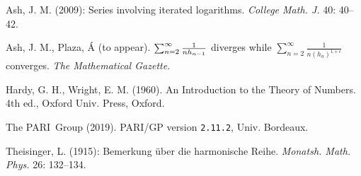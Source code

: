 \documentclass{article}
\theoremstyle{theorem}
\theoremstyle{definition}
\begin{document}
\begin{thebibliography}{1}
 Ash, J. M. (2009): Series involving iterated logarithms.
\textit{College Math. J.} 40: 40--42. %

 Ash, J. M., Plaza, \'{A} (to appear).  $\sum_{n=2}^{\infty }\frac{%
1}{nh_{n-1}}$ diverges while $\sum_{n=2}^{\infty }\frac{1}{n\left(
h_{n}\right) ^{1+\epsilon }}$ converges. \textit{The Mathematical Gazette.} %

 Hardy, G. H., Wright, E. M. (1960). An Introduction to the Theory
of Numbers. 4th ed., Oxford Univ. Press, Oxford.

 The PARI~Group (2019). PARI/GP version \texttt{2.11.2}, Univ. Bordeaux.

 Theisinger, L. (1915): Bemerkung \"{u}ber die harmonische
Reihe. \textit{Monatsh. Math. Phys.} 26: 132--134.
\end{thebibliography}




\vfill\eject
\end{document}
